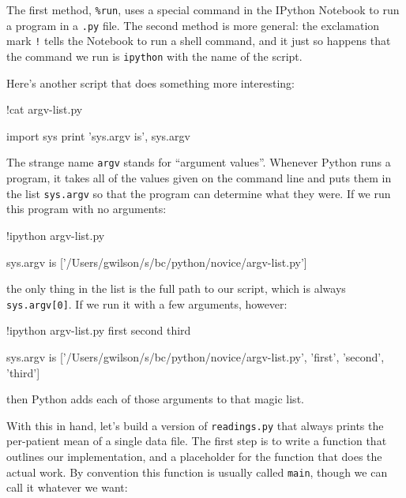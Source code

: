 \documentclass{book}
\begin{document}
The first method, \texttt{\%run}, uses a special command in the IPython
Notebook to run a program in a \texttt{.py} file. The second method is
more general: the exclamation mark \texttt{!} tells the Notebook to run
a shell command, and it just so happens that the command we run is
\texttt{ipython} with the name of the script.

Here's another script that does something more interesting:

\begin{VerbIn}
!cat argv-list.py
\end{VerbIn}

\begin{VerbOut}
import sys
print 'sys.argv is', sys.argv
\end{VerbOut}

The strange name \texttt{argv} stands for ``argument values''. Whenever
Python runs a program, it takes all of the values given on the command
line and puts them in the list \texttt{sys.argv} so that the program can
determine what they were. If we run this program with no arguments:

\begin{VerbIn}
!ipython argv-list.py
\end{VerbIn}

\begin{VerbOut}
sys.argv is ['/Users/gwilson/s/bc/python/novice/argv-list.py']
\end{VerbOut}

the only thing in the list is the full path to our script, which is
always \texttt{sys.argv{[}0{]}}. If we run it with a few arguments,
however:

\begin{VerbIn}
!ipython argv-list.py first second third
\end{VerbIn}

\begin{VerbOut}
sys.argv is ['/Users/gwilson/s/bc/python/novice/argv-list.py', 'first', 'second', 'third']
\end{VerbOut}

then Python adds each of those arguments to that magic list.

With this in hand, let's build a version of \texttt{readings.py} that
always prints the per-patient mean of a single data file. The first step
is to write a function that outlines our implementation, and a
placeholder for the function that does the actual work. By convention
this function is usually called \texttt{main}, though we can call it
whatever we want:
\end{document}
